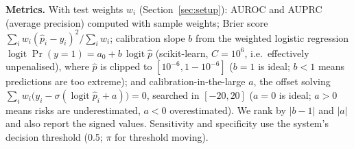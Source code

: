 \textbf{Metrics.} With test weights $w_i$ (Section~\ref{sec:setup}): AUROC and AUPRC (average precision) computed with sample weights; Brier score $\sum_i w_i(\hat p_i-y_i)^2/\sum_i w_i$; calibration slope $b$ from the weighted logistic regression $\operatorname{logit}\Pr(y{=}1)=a_0+b\,\operatorname{logit}\hat p$ (scikit-learn, $C=10^6$, i.e.\ effectively unpenalised), where $\hat p$ is clipped to $[10^{-6},1-10^{-6}]$ ($b=1$ is ideal; $b<1$ means predictions are too extreme); and calibration-in-the-large $a$, the offset solving $\sum_i w_i\big(y_i-\sigma(\operatorname{logit}\hat p_i+a)\big)=0$, searched in $[-20,20]$ ($a=0$ is ideal; $a>0$ means risks are underestimated, $a<0$ overestimated). We rank by $|b-1|$ and $|a|$ and also report the signed values. Sensitivity and specificity use the system's decision threshold (0.5; $\pi$ for threshold moving).
